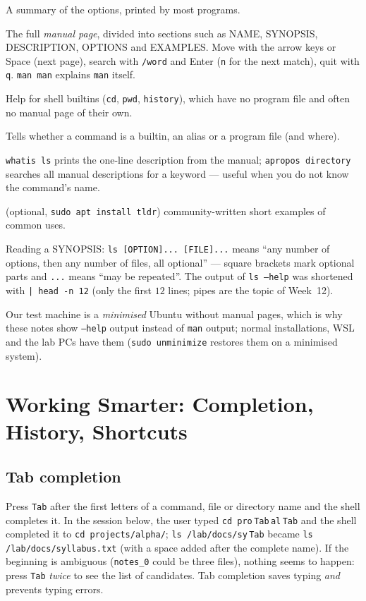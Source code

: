 \documentclass[11pt,a4paper]{article}
\newcommand{\cmd}[1]{\texttt{#1}}
\begin{document}
\begin{description}[leftmargin=0pt,itemsep=0.25em]
  \item[\cmd{command --help}] A summary of the options, printed by most programs.
  \item[\cmd{man command}] The full \emph{manual page}, divided into sections such as NAME, SYNOPSIS, DESCRIPTION, OPTIONS and EXAMPLES. Move with the arrow keys or Space (next page), search with \texttt{/word} and Enter (\texttt{n} for the next match), quit with \texttt{q}. \cmd{man man} explains \cmd{man} itself.
  \item[\cmd{help command}] Help for shell builtins (\cmd{cd}, \cmd{pwd}, \cmd{history}), which have no program file and often no manual page of their own.
  \item[\cmd{type command}] Tells whether a command is a builtin, an alias or a program file (and where).
  \item[\cmd{whatis} / \cmd{apropos}] \cmd{whatis ls} prints the one-line description from the manual; \cmd{apropos directory} searches all manual descriptions for a keyword --- useful when you do not know the command's name.
  \item[\cmd{tldr command}] (optional, \cmd{sudo apt install tldr}) community-written short examples of common uses.
\end{description}


Reading a SYNOPSIS: \texttt{ls [OPTION]... [FILE]...} means ``any number of options, then any number of files, all optional'' --- square brackets mark optional parts and \texttt{...} means ``may be repeated''. The output of \cmd{ls --help} was shortened with \texttt{| head -n 12} (only the first $12$ lines; pipes are the topic of Week~12).

Our test machine is a \emph{minimised} Ubuntu without manual pages, which is why these notes show \cmd{--help} output instead of \cmd{man} output; normal installations, WSL and the lab PCs have them (\cmd{sudo unminimize} restores them on a minimised system).

\section{Working Smarter: Completion, History, Shortcuts}

\subsection{Tab completion}
Press \texttt{Tab} after the first letters of a command, file or directory name and the shell completes it. In the session below, the user typed \texttt{cd pro}\,\texttt{Tab}\,\texttt{al}\,\texttt{Tab} and the shell completed it to \texttt{cd projects/alpha/}; \texttt{ls \tl/lab/docs/sy}\,\texttt{Tab} became \texttt{ls \tl/lab/docs/syllabus.txt} (with a space added after the complete name). If the beginning is ambiguous (\texttt{notes\_0} could be three files), nothing seems to happen: press \texttt{Tab} \emph{twice} to see the list of candidates. Tab completion saves typing \emph{and} prevents typing errors.
\end{document}
